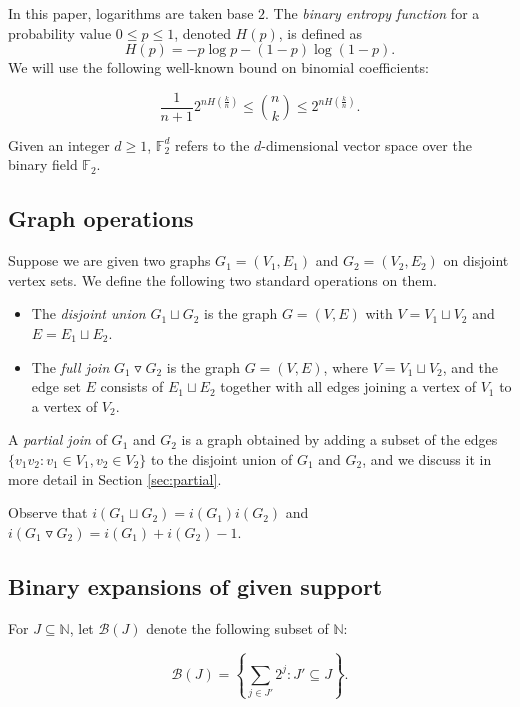 \documentclass[10pt,a4paper]{article}
\numberwithin{equation}{section}
\newcommand{\nn}{\mathbb{N}}
\newcommand{\ff}{\mathbb{F}}
\newcommand{\cB}{\mathcal{B}}
\begin{document}
In this paper, logarithms are taken base $2$. The \textit{binary entropy function} for a probability value $0\le p\le 1$, denoted $H(p)$, is defined as
$$H(p)=-p\log p-(1-p)\log (1-p).$$
We will use the following well-known bound on binomial coefficients:

\begin{lemma}\label{lem:entropy_bound}
$$\frac{1}{n+1}2^{nH\left(\frac{k}{n}\right)}\le \binom{n}{k}\le 2^{nH\left(\frac{k}{n}\right)}.$$
\end{lemma}

\noindent Given an integer $d\ge 1$, $\ff_2^d$ refers to the $d$-dimensional vector space over the binary field $\ff_2$.

\subsection{Graph operations}

Suppose we are given two graphs $G_1=(V_1,E_1)$ and $G_2=(V_2,E_2)$ on disjoint vertex sets. We define the following two standard operations on them.
\begin{itemize}
\itemsep0em
\item The \textit{disjoint union} $G_1\sqcup G_2$ is the graph $G=(V,E)$ with $V=V_1\sqcup V_2$ and $E=E_1\sqcup E_2$.
\item The \textit{full join} $G_1\triangledown G_2$ is the graph $G=(V,E)$, where $V=V_1\sqcup V_2$, and the edge set $E$ consists of $E_1\sqcup E_2$ together with all edges joining a vertex of $V_1$ to a vertex of $V_2$.
\end{itemize}

A \textit{partial join} of $G_1$ and $G_2$ is a graph obtained by adding a subset of the edges $\{v_1v_2: v_1\in V_1, v_2\in V_2\}$ to the disjoint union of $G_1$ and $G_2$, and we discuss it in more detail in Section \ref{sec:partial}.

Observe that $i(G_1\sqcup G_2)=i(G_1)i(G_2)$ and $i(G_1\triangledown G_2)=i(G_1)+i(G_2)-1$.

\subsection{Binary expansions of given support}

For $J\subseteq \nn$, let $\cB(J)$ denote the following subset of $\nn$:

$$\cB(J)=\left\{\sum_{j\in J'} 2^j: J'\subseteq J\right\}.$$
\end{document}
